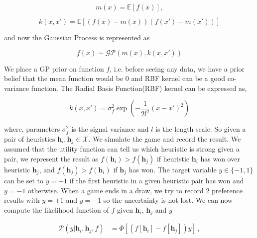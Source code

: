 \documentclass{scrartcl}
\begin{document}
	\begin{equation}
m(x) = \mathbb{E} [f(x)],
\end{equation}


\begin{equation}
k(x,x\prime) = \mathbb{E}[(f(x) - m(x))(f(x\prime)-m(x\prime))]
\end{equation}

and now the Gaussian Process is represented as

\begin{equation}
f(x) \sim \mathcal{GP} (m(x),k(x,x\prime)) 
\end{equation}


	We place a GP prior on function $f$, i.e. before seeing any data, we have a prior belief that the mean function would be 0 and RBF kernel can be a good co-variance function. The Radial Basis Function(RBF) kernel can be expressed as,

\begin{equation}
k(x , x\prime) = \sigma_f^2 \exp( - \frac {1}{2l^2}(x - x\prime)^2)
\end{equation}


where, parameters $\sigma_f^2$ is the signal variance and $l$ is the length scale. So given a pair of heuristics $\mathbf{h}_i,\mathbf{h}_j\in\mathcal{X}$. We simulate the game and record the result. We assumed that the utility function can tell us which heuristic is strong given a pair, we represent the result as $f(\mathbf{h}_i) > f(\mathbf{h}_j)$ if heuristic $\mathbf{h}_i$ has won over heuristic $\mathbf{h}_j$, and $f(\mathbf{h}_j) > f(\mathbf{h}_i)$ if $\mathbf{h}_j$ has won. The target variable $y\in\{-1,1\}$ can be set to $y=+1$ if the first heuristic in a given heuristic pair has won and $y=-1$ otherwise. When a game ends in a draw, we try to record 2 preference results with $y=+1$ and $y=-1$ so the uncertainty is not lost. We can now compute the likelihood function\cite{chu2005preference} of  $f$ given $\mathbf{h}_i$, $\mathbf{h}_j$ and $y$

	\hfill 
	
	\vspace{-0.65cm}
{\small
\begin{align}
\mathcal{P}(y|\mathbf{h}_i,\mathbf{h}_j,f) &= \Phi[(f[\mathbf{h}_i] - f[\mathbf{h}_j])y]\,,\label{eq:likelihood}
\end{align}
}

\vspace{-0.7cm}

\hfill
\end{document}
